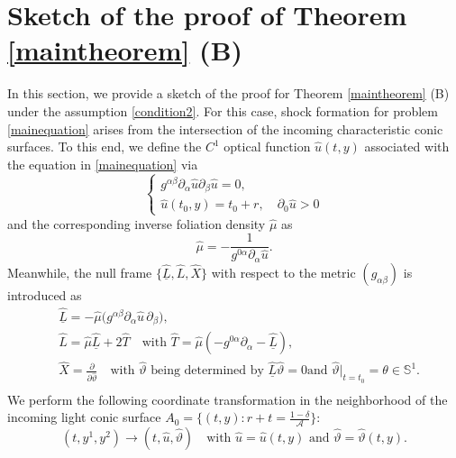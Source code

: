 \documentclass[11pt,twoside]{article}
\def\al{\alpha}
\def\be{\beta}
\def\th{\theta}
\def\f{\frac}
\def\p{\partial}
\begin{document}
\section{Sketch of the proof of Theorem \ref{maintheorem} (B)}\label{incoming}
In this section, we provide a sketch of the proof for Theorem \ref{maintheorem} (B) under the assumption \eqref{condition2}.
For this case, shock formation for problem \eqref{mainequation} arises from the intersection of the incoming characteristic conic surfaces.
To this end, we define the $C^1$ optical function ${\hat u}(t,y)$ associated with the equation in \eqref{mainequation} via
\begin{equation}\label{eikonal equation-1}
\begin{cases}
g^{\al\be}\p_{\al}{\hat  u}\p_{\be}{\hat  u}=0,\\
{\hat  u}(t_0,y)=t_0+r,\quad \p_{0}{\hat  u}>0
\end{cases}
\end{equation}
and the corresponding inverse foliation density \(\hat\mu\) as
\[
\hat\mu=-\frac{1}{g^{0\al}\p_{\al}\hat u}.
\]
Meanwhile,  the null frame $\{\hat{\underline L}, \hat L, \hat X\}$ with respect to the metric $(g_{\al\beta})$
is introduced as
\begin{equation}\label{Lr-1}
\begin{split}	
&\hat{\underline L}=-\hat\mu\bigl(g^{\al\beta}\p_\al\hat u\,\p_\beta\bigr),\\
&\hat L={\hat\mu}\hat{\underline L}+2\hat T
\quad \text{with $\hat T=\hat\mu(-g^{0\al}\p_\al-\hat{\underline L})$},\\
&\hat X=\f{\p}{\p{\hat\vartheta}}\quad\text{with $\hat\vartheta$ being determined by ${\hat{\underline L}}{\hat\vartheta}=0$
and $\hat\vartheta|_{t=t_0}=\th\in\mathbb{S}^1$}.\\	
\end{split}
\end{equation}
We perform the following coordinate transformation in the neighborhood of the incoming light conic surface
\(A_0=\{(t,y): r+t = \frac{1-\delta}{\mathcal A}\}\):
$$(t, y^1, y^2)\longrightarrow (t, \hat u, \hat\vartheta)\quad\text{with $\hat u=\hat u(t,y)$ and $\hat\vartheta=\hat\vartheta(t,y)$}.
$$
\end{document}
